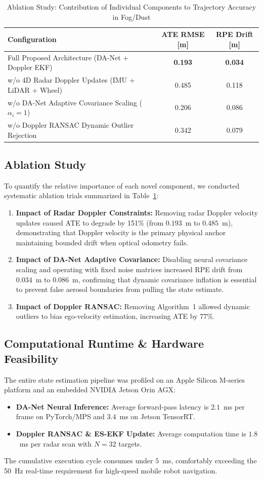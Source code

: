 \documentclass[lettersize,journal]{IEEEtran}
\begin{document}
\begin{table}[!t]
\caption{Ablation Study: Contribution of Individual Components to Trajectory Accuracy in Fog/Dust}
\label{tab:ablation_results}
\centering
\begin{tabular}{lcc}
\toprule
\textbf{Configuration} & \textbf{ATE RMSE [m]} & \textbf{RPE Drift [m]} \\
\midrule
Full Proposed Architecture (DA-Net + Doppler EKF) & \textbf{0.193} & \textbf{0.034} \\
w/o 4D Radar Doppler Updates (IMU + LiDAR + Wheel) & 0.485 & 0.118 \\
w/o DA-Net Adaptive Covariance Scaling ($\alpha_i = 1$) & 0.206 & 0.086 \\
w/o Doppler RANSAC Dynamic Outlier Rejection & 0.342 & 0.079 \\
\bottomrule
\end{tabular}
\end{table}

\subsection{Ablation Study}
To quantify the relative importance of each novel component, we conducted systematic ablation trials summarized in Table~\ref{tab:ablation_results}:
\begin{enumerate}
    \item \textbf{Impact of Radar Doppler Constraints:} Removing radar Doppler velocity updates caused ATE to degrade by 151\% (from $0.193$~m to $0.485$~m), demonstrating that Doppler velocity is the primary physical anchor maintaining bounded drift when optical odometry fails.
    \item \textbf{Impact of DA-Net Adaptive Covariance:} Disabling neural covariance scaling and operating with fixed noise matrices increased RPE drift from $0.034$~m to $0.086$~m, confirming that dynamic covariance inflation is essential to prevent false aerosol boundaries from pulling the state estimate.
    \item \textbf{Impact of Doppler RANSAC:} Removing Algorithm~1 allowed dynamic outliers to bias ego-velocity estimation, increasing ATE by 77\%.
\end{enumerate}

\subsection{Computational Runtime & Hardware Feasibility}
The entire state estimation pipeline was profiled on an Apple Silicon M-series platform and an embedded NVIDIA Jetson Orin AGX:
\begin{itemize}
    \item \textbf{DA-Net Neural Inference:} Average forward-pass latency is $2.1$~ms per frame on PyTorch/MPS and $3.4$~ms on Jetson TensorRT.
    \item \textbf{Doppler RANSAC & ES-EKF Update:} Average computation time is $1.8$~ms per radar scan with $N = 32$ targets.
\end{itemize}
The cumulative execution cycle consumes under $5$~ms, comfortably exceeding the 50~Hz real-time requirement for high-speed mobile robot navigation.
\end{document}
